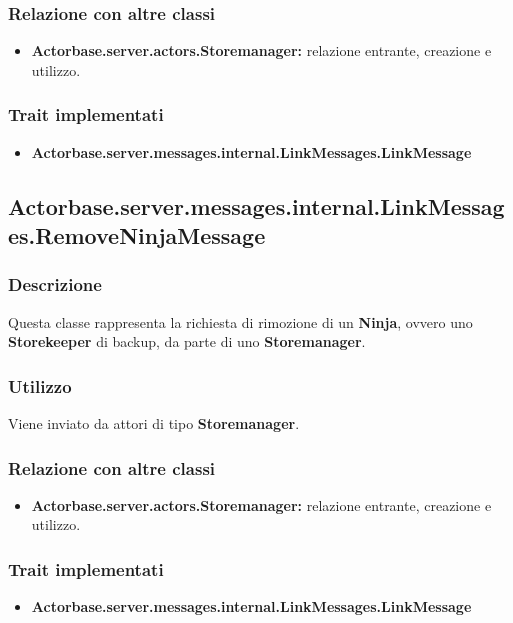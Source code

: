 \documentclass[a4paper]{article}
\begin{document}
			\subsubsection{Relazione con altre classi}
				\begin{itemize}
					\item \textbf{Actorbase.server.actors.Storemanager:} relazione entrante, creazione e utilizzo.
				\end{itemize}
				
			\subsubsection{Trait implementati}
				\begin{itemize}
					\item \textbf{Actorbase.server.messages.internal.LinkMessages.LinkMessage} 
				\end{itemize}
				
		\subsection{Actorbase.server.messages.internal.LinkMessages.RemoveNinjaMessage}
			\subsubsection{Descrizione}
				Questa classe rappresenta la richiesta di rimozione di un \textbf{Ninja}, ovvero uno \textbf{Storekeeper} di backup, da 
				parte di uno \textbf{Storemanager}.
				
			\subsubsection{Utilizzo}
				Viene inviato da attori di tipo \textbf{Storemanager}.
				
			\subsubsection{Relazione con altre classi}
				\begin{itemize}
					\item \textbf{Actorbase.server.actors.Storemanager:} relazione entrante, creazione e utilizzo.
				\end{itemize}
				
			\subsubsection{Trait implementati}
				\begin{itemize}
					\item \textbf{Actorbase.server.messages.internal.LinkMessages.LinkMessage} 
				\end{itemize}
				
\end{document}
